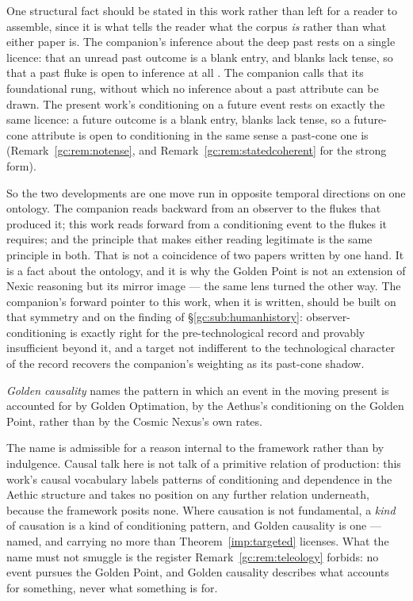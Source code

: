 \begin{remark}
\label{gc:rem:rungzero}
One structural fact should be stated in this work rather than left for a
reader to assemble, since it is what tells the reader what the corpus
\emph{is} rather than what either paper is. The companion's inference about the deep past rests on a single licence:
that an unread past outcome is a blank entry, and blanks lack tense, so
that a past fluke is open to inference at all
\cite{Aethus,NexicFoundation}. The companion calls that its
foundational rung, without which no inference about a past attribute can
be drawn. The present work's conditioning on a future event rests on
exactly the same licence: a future outcome is a blank entry, blanks lack
tense, so a future-cone attribute is open to conditioning in the same
sense a past-cone one is (Remark~\ref{gc:rem:notense}, and
Remark~\ref{gc:rem:statedcoherent} for the strong form).

So the two developments are one move run in opposite temporal directions
on one ontology. The companion reads backward from an observer to the
flukes that produced it; this work reads forward from a conditioning
event to the flukes it requires; and the principle that makes either
reading legitimate is the same principle in both. That is not a
coincidence of two papers written by one hand. It is a fact about the
ontology, and it is why the Golden Point is not an extension of Nexic
reasoning but its mirror image --- the same lens turned the other way.
The companion's forward pointer to this work, when it is written, should
be built on that symmetry and on the finding of
\S\ref{gc:sub:humanhistory}: observer-conditioning is exactly right for
the pre-technological record and provably insufficient beyond it, and a
target not indifferent to the technological character of the record
recovers the companion's weighting as its past-cone shadow.
\end{remark}

\begin{definition}\label{gc:def:goldencausality}
\emph{Golden causality} names the pattern in which an event in the moving
present is accounted for by Golden Optimation, by the Aethus's
conditioning on the Golden Point, rather than by the Cosmic Nexus's
own rates.
\end{definition}

The name is admissible for a reason internal to the framework rather than
by indulgence. Causal talk here is not talk of a primitive relation of
production: this work's causal vocabulary labels patterns of conditioning
and dependence in the Aethic structure and takes no position on any
further relation underneath, because the framework posits none. Where
causation is not fundamental, a \emph{kind} of causation is a kind of
conditioning pattern, and Golden causality is one --- named, and carrying
no more than Theorem~\ref{imp:targeted} licenses. What the name must not
smuggle is the register Remark~\ref{gc:rem:teleology} forbids: no event
pursues the Golden Point, and Golden causality describes what accounts
for something, never what something is for.

